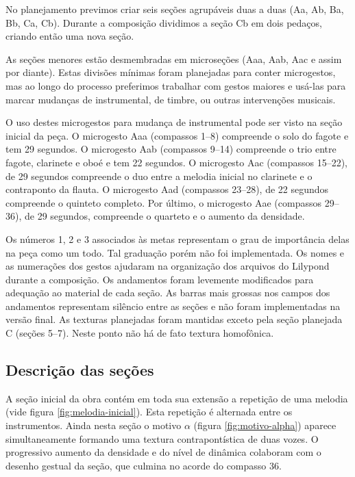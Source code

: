 No planejamento previmos criar seis seções agrupáveis duas a duas (Aa,
Ab, Ba, Bb, Ca, Cb). Durante a composição dividimos a seção Cb em dois
pedaços, criando então uma nova seção.

As seções menores estão desmembradas em microseções (Aaa, Aab, Aac e
assim por diante). Estas divisões mínimas foram planejadas para conter
microgestos, mas ao longo do processo preferimos trabalhar com gestos
maiores e usá-las para marcar mudanças de instrumental, de timbre, ou
outras intervenções musicais.

O uso destes microgestos para mudança de instrumental pode ser visto
na seção inicial da peça. O microgesto Aaa (compassos 1--8) compreende
o solo do fagote e tem 29 segundos. O microgesto Aab (compassos 9--14)
compreende o trio entre fagote, clarinete e oboé e tem 22 segundos. O
microgesto Aac (compassos 15--22), de 29 segundos compreende o duo
entre a melodia inicial no clarinete e o contraponto da flauta. O
microgesto Aad (compassos 23--28), de 22 segundos compreende o
quinteto completo. Por último, o microgesto Aae (compassos 29--36), de
29 segundos, compreende o quarteto e o aumento da densidade.

Os números 1, 2 e 3 associados às metas representam o grau de
importância delas na peça como um todo. Tal graduação porém não foi
implementada. Os nomes e as numerações dos gestos ajudaram na
organização dos arquivos do Lilypond durante a composição. Os
andamentos foram levemente modificados para adequação ao material de
cada seção. As barras mais grossas nos campos dos andamentos
representam silêncio entre as seções e não foram implementadas na
versão final. As texturas planejadas foram mantidas exceto pela seção
planejada C (seções 5--7). Neste ponto não há de fato textura
homofônica.

\subsection{Descrição das seções}
\label{sec:descricao-das-secoes}

A seção inicial da obra contém em toda sua extensão a repetição de uma
melodia (vide figura \ref{fig:melodia-inicial}). Esta repetição é
alternada entre os instrumentos. Ainda nesta seção o motivo $\alpha$
(figura \ref{fig:motivo-alpha}) aparece simultaneamente formando uma
textura contrapontística de duas vozes. O progressivo aumento da
densidade e do nível de dinâmica colaboram com o desenho gestual da
seção, que culmina no acorde do compasso 36.

